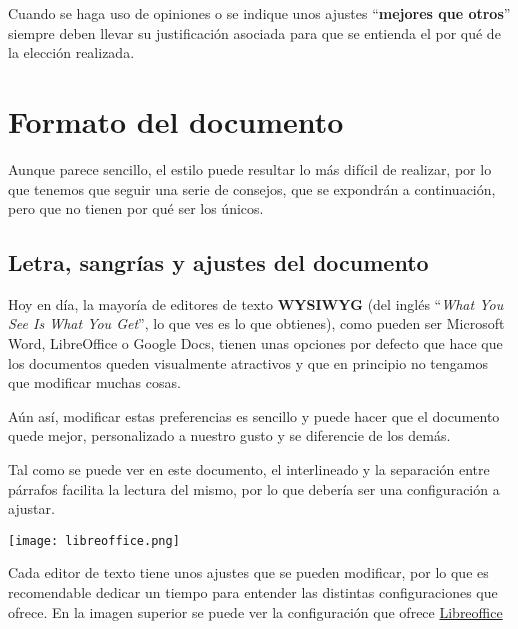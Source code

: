 Cuando se haga uso de opiniones o se indique unos ajustes “\textbf{mejores que otros}” siempre deben llevar su justificación asociada para que se entienda el por qué de la elección realizada.



\chapter{Formato del documento}
Aunque parece sencillo, el estilo puede resultar lo más difícil de realizar, por lo que tenemos que seguir una serie de consejos, que se expondrán a continuación, pero que no tienen por qué ser los únicos.


\section{Letra, sangrías y ajustes del documento}
Hoy en día, la mayoría de editores de texto \textbf{WYSIWYG} (del inglés “\textit{What You See Is What You Get}”, lo que ves es lo que obtienes), como pueden ser Microsoft Word, LibreOffice o Google Docs, tienen unas opciones por defecto que hace que los documentos queden visualmente atractivos y que en principio no tengamos que modificar muchas cosas.

Aún así, modificar estas preferencias es sencillo y puede hacer que el documento quede mejor, personalizado a nuestro gusto y se diferencie de los demás.



Tal como se puede ver en este documento, el interlineado y la separación entre párrafos facilita la lectura del mismo, por lo que debería ser una configuración a ajustar.

\begin{center}
    \texttt{[image: libreoffice.png]}
\end{center}

Cada editor de texto tiene unos ajustes que se pueden modificar, por lo que es recomendable dedicar un tiempo para entender las distintas configuraciones que ofrece. En la imagen superior se puede ver la configuración que ofrece \href{https://es.libreoffice.org/}{Libreoffice}


